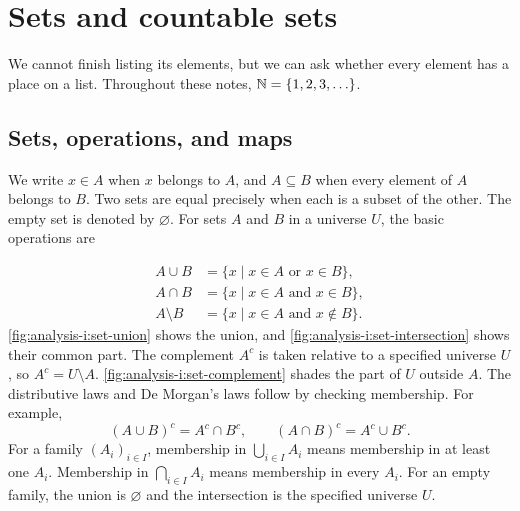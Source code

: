 \section{Sets and countable sets}
\label{sec:analysis-i:sets-and-countable-sets}

 We cannot finish listing its
elements, but we can ask whether every element has a place on a list.
Throughout these notes, $\mathbb{N}=\{1,2,3,\ldots\}$.

\subsection{Sets, operations, and maps}
We write $x\in A$ when $x$ belongs to $A$, and $A\subseteq B$ when every
element of $A$ belongs to $B$. Two sets are equal precisely when each is
a subset of the other. The empty set is denoted by $\varnothing$.
For sets $A$ and $B$ in a universe $U$, the basic operations are
\begin{marginfigure}[-4\baselineskip]
  \centering
  
  \caption[Union of two sets.]{Shading marks $A\cup B$, including the overlap.}
  \label{fig:analysis-i:set-union}
\end{marginfigure}
\begin{marginfigure}
  \centering
  
  \caption[Intersection of two sets.]{Shading marks $A\cap B$, the overlap.}
  \label{fig:analysis-i:set-intersection}
\end{marginfigure}
\begin{marginfigure}
  \centering
  
  \caption[Complement in a universe.]{Shading marks $A^c=U\setminus A$.}
  \label{fig:analysis-i:set-complement}
\end{marginfigure}
\begin{align*}
  A\cup B&=\{x\mid x\in A\text{ or }x\in B\},\\
  A\cap B&=\{x\mid x\in A\text{ and }x\in B\},\\
  A\setminus B&=\{x\mid x\in A\text{ and }x\notin B\}.
\end{align*}
\autoref{fig:analysis-i:set-union} shows the union, and
\autoref{fig:analysis-i:set-intersection} shows their common part.
The complement $A^c$ is taken relative to a specified universe $U$, so
$A^c=U\setminus A$. \autoref{fig:analysis-i:set-complement} shades the
part of $U$ outside $A$. The distributive laws and De Morgan's laws follow by
checking membership. For example,
\[
  (A\cup B)^c=A^c\cap B^c,
  \qquad (A\cap B)^c=A^c\cup B^c.
\]
For a family $(A_i)_{i\in I}$, membership in $\bigcup_{i\in I}A_i$ means
membership in at least one $A_i$. Membership in $\bigcap_{i\in I}A_i$
means membership in every $A_i$.
For an empty family, the union is $\varnothing$ and the intersection is
the specified universe $U$.

